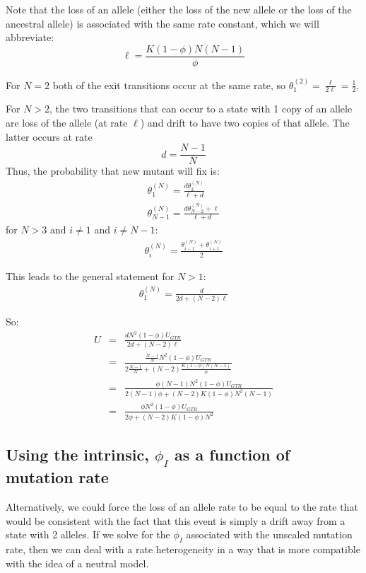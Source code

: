 \documentclass{llncs}
\newcommand{\polyProb}{\ensuremath{\phi}}
\newcommand{\Knorm}{\ensuremath{K}}
\begin{document}
Note that the loss of an allele (either the loss of the new allele or the 
    loss of the ancestral allele) is associated with the same rate constant, which we will
    abbreviate:
    $$\ell = \frac{\Knorm (1-\polyProb)N(N-1)}{\polyProb }$$

For $N=2$ both of the exit transitions occur at the same rate, so $\theta_1^{(2)} = \frac{\ell}{2\ell} = \frac{1}{2}$.

For $N > 2$, the two transitions that can occur to a state with 1 copy of an allele are 
    loss of the allele (at rate $\ell$) and drift to have two copies of that allele.
The latter occurs at rate $$d = \frac{N-1}{N}$$
Thus, the probability that new mutant will fix is:
\begin{eqnarray}
    \theta_1^{(N)} = \frac{d\theta_2^{(N)}}{\ell + d} \\
    \theta_{N-1}^{(N)} = \frac{d\theta_{N-2}^{(N)} + \ell}{\ell + d}
\end{eqnarray}
for $N > 3$ and $i \neq 1$ and $i \neq N-1$:
\begin{eqnarray}
    \theta_{i}^{(N)} = \frac{\theta_{i-1}^{(N)} + \theta_{i+1}^{(N)}}{2}
\end{eqnarray}

This leads to the general statement for $N > 1$:
\begin{eqnarray}
    \theta_1^{(N)} = \frac{d}{2d + (N-2)\ell}
\end{eqnarray}

So:
\begin{eqnarray}
 U & = &  \frac{dN^2(1-\polyProb)U_{GTR}}{2d + (N-2)\ell} \\
  & = &  \frac{\frac{N-1}{N}N^2(1-\polyProb)U_{GTR}}{2\frac{N-1}N
                                                     + (N-2)\frac{\Knorm (1-\polyProb)N(N-1)}{\polyProb }} \\
  & = &  \frac{\polyProb(N-1)N^2(1-\polyProb)U_{GTR}}{2(N-1)\polyProb
                                                     + (N-2)\Knorm (1-\polyProb)N^2(N-1)} \\
  & = &  \frac{\polyProb N^2(1-\polyProb)U_{GTR}}{2\polyProb
                                                     + (N-2)\Knorm (1-\polyProb)N^2}
\end{eqnarray}

\subsection{Using the intrinsic, $\polyProb_I$ as a function of mutation rate}
Alternatively, we could force the loss of an allele rate to be equal to the rate that
    would be consistent with the fact that this event is simply a drift away from
    a state with 2 alleles.
If we solve for the $\polyProb_I$ associated with the unscaled mutation rate, then we
    can deal with a rate heterogeneity in a way that is more compatible with the 
    idea of a neutral model.
\end{document}
